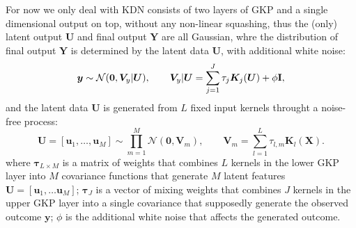 \documentclass[11pt]{article}
\newcommand{\bs}{\boldsymbol}
\newcommand{\vu}{\boldsymbol{u}}
\newcommand{\vy}{\boldsymbol{y}}
\newcommand{\xv}{\boldsymbol{V}}
\newcommand{\xk}{\boldsymbol{K}}
\newcommand{\xx}{\boldsymbol{X}}
\newcommand{\xu}{\boldsymbol{U}}
\newcommand{\xy}{\boldsymbol{Y}}
\newcommand{\id}{\textrm{\textbf{I}}}
\begin{document}
For now we only deal with KDN consists of two layers of GKP and a single dimensional output on top, without any non-linear squashing, thus the (only) latent output $\xu$ and final output $\xy$ are all Gaussian, whre the distribution of final output $\xy$ is determined by the latent data $\xu$, with additional white noise:
\begin{equation}\label{eq:y_dst}
  \vy \sim \mathcal{N}(\bs{0}, \xv_y|\xu), \qquad \xv_y|\xu = \sum_{j=1}^J \tau_j \xk_j(\xu) + \phi\id,
\end{equation}
and the latent data $\xu$ is generated from $L$ fixed input kernels throught a noise-free process:
\begin{equation}\label{eq:u_dst}
  \xu = [\vu_1, \dots, \vu_M] \sim \prod_{m=1}^M \mathcal{N}(\bs{0}, \xv_m), \qquad \xv_m = \sum_{l=1}^{L}\tau_{l,m}\xk_l(\xx).
\end{equation}
where $\bs{\tau}_{L \times M}$ is a matrix of weights that combines $L$ kernels in the lower GKP layer into $M$ covariance functions that generate $M$ latent features $\xu=[\vu_1, \dots \vu_M]$; $\bs{\tau}_{J}$ is a vector of mixing weights that combines $J$ kernels in the upper GKP layer into a single covariance that supposedly generate the observed outcome $\vy$; $\phi$ is the additional white noise that affects the generated outcome. 
\end{document}
